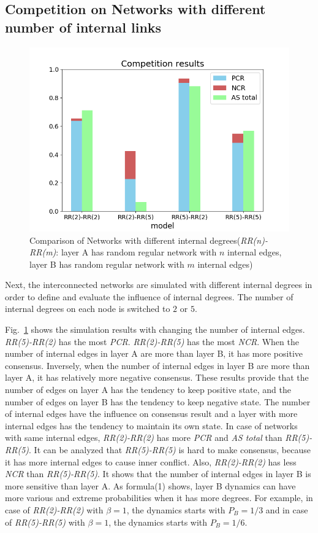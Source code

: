 \documentclass[english]{cccconf}
\begin{document}
\subsection{Competition on Networks with different number of internal links}
\begin{figure}[!htb]
	\centering
	\includegraphics[width=\hsize]{FIG5.png}
	\caption{Comparison of Networks with different internal degrees(\textit{RR(n)-RR(m)}: layer A has random regular network with $n$ internal edges, layer B has random regular network with $m$ internal edges)}
	\label{Fig5}
\end{figure}
Next, the interconnected networks are simulated with different internal degrees in order to define and evaluate the influence of internal degrees. The number of internal degrees on each node is switched to $2$ or $5$.

Fig.~\ref{Fig5} shows the simulation results with changing the number of internal edges. \textit{RR(5)-RR(2)} has the most \textit{PCR}. \textit{RR(2)-RR(5)} has the most \textit{NCR}. When the number of internal edges in layer A are more than layer B, it has more positive consensus. Inversely, when the number of internal edges in layer B are more than layer A, it has relatively more negative consensus. These results provide that the number of edges on layer A has the tendency to keep positive state, and the number of edges on layer B has the tendency to keep negative state. The number of internal edges have the influence on consensus result and a layer with more internal edges has the tendency to maintain its own state. In case of networks with same internal edges, \textit{RR(2)-RR(2)} has more \textit{PCR} and \textit{AS total} than \textit{RR(5)-RR(5)}. It can be analyzed that \textit{RR(5)-RR(5)} is hard to make consensus, because it has more internal edges to cause inner conflict. Also, \textit{RR(2)-RR(2)} has less \textit{NCR} than \textit{RR(5)-RR(5)}. It shows that the number of internal edges in layer B is more sensitive than layer A. As formula(1) shows, layer B dynamics can have more various and extreme probabilities when it has more degrees. For example, in case of \textit{RR(2)-RR(2)} with $\beta = 1$, the dynamics starts with $P_B=1/3$ and in case of \textit{RR(5)-RR(5)} with $\beta = 1$, the dynamics starts with $P_B=1/6$.    
\end{document}
